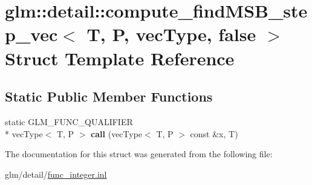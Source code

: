\hypertarget{structglm_1_1detail_1_1compute__findMSB__step__vec_3_01T_00_01P_00_01vecType_00_01false_01_4}{\section{glm\-:\-:detail\-:\-:compute\-\_\-find\-M\-S\-B\-\_\-step\-\_\-vec$<$ T, P, vec\-Type, false $>$ Struct Template Reference}
\label{structglm_1_1detail_1_1compute__findMSB__step__vec_3_01T_00_01P_00_01vecType_00_01false_01_4}
}
\subsection*{Static Public Member Functions}
\begin{DoxyCompactItemize}
\item 
\hypertarget{structglm_1_1detail_1_1compute__findMSB__step__vec_3_01T_00_01P_00_01vecType_00_01false_01_4_a6be49d6f06a7dd467a63a87a6d2af757}{static G\-L\-M\-\_\-\-F\-U\-N\-C\-\_\-\-Q\-U\-A\-L\-I\-F\-I\-E\-R \\*
vec\-Type$<$ T, P $>$ {\bfseries call} (vec\-Type$<$ T, P $>$ const \&x, T)}\label{structglm_1_1detail_1_1compute__findMSB__step__vec_3_01T_00_01P_00_01vecType_00_01false_01_4_a6be49d6f06a7dd467a63a87a6d2af757}

\end{DoxyCompactItemize}


The documentation for this struct was generated from the following file\-:\begin{DoxyCompactItemize}
\item 
glm/detail/\hyperlink{func__integer_8inl}{func\-\_\-integer.\-inl}\end{DoxyCompactItemize}
